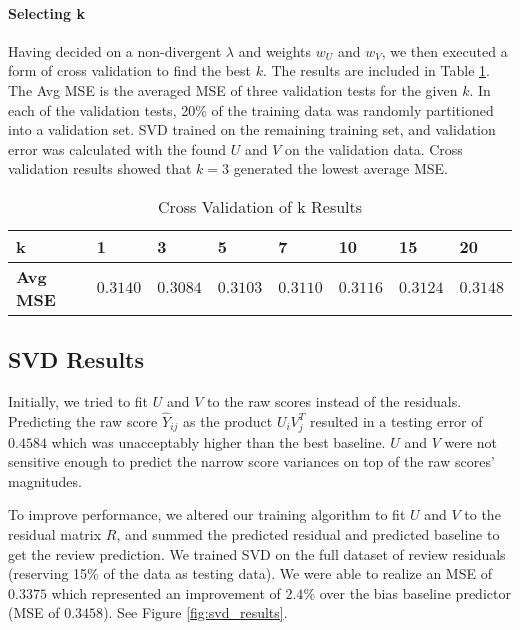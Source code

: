 \documentclass[12pt]{article}
\begin{document}
\paragraph{Selecting k} Having decided on a non-divergent $\lambda$ and weights $w_U$ and $w_V$, we then executed a form of cross validation to find the best $k$. The results are included in Table \ref{tab:k_selection}. The Avg MSE is the averaged MSE of three validation tests for the given $k$. In each of the validation tests, 20\% of the training data was randomly partitioned into a validation set. SVD trained on the remaining training set, and validation error was calculated with the found $U$ and $V$ on the validation data. Cross validation results showed that $k = 3$ generated the lowest average MSE. 

\begin{table}[ht!]
\centering
\caption{Cross Validation of k Results}
\label{tab:k_selection}
\vspace{2mm}
\begin{tabular}{llllllll}
\hline
\textbf{k}             &  1 				& \textbf{3}          	& 5             & 7             & 10        & 15        & 20 \\ \hline
\textbf{Avg MSE}       & $0.3140$		& {$\mathbf{0.3084}$}   	& $0.3103$      & $0.3110$      & $0.3116$  & $0.3124$  & $0.3148$\\ \hline
\end{tabular}
\end{table}

\subsection*{SVD Results}
Initially, we tried to fit $U$ and $V$ to the raw scores instead of the residuals. Predicting the raw score $\hat Y_{ij}$ as the product $U_i V_j^T$ resulted in a testing error of $0.4584$ which was unacceptably higher than the best baseline. $U$ and $V$ were not sensitive enough to predict the narrow score variances on top of the raw scores' magnitudes.

To improve performance, we altered our training algorithm to fit $U$ and $V$ to the residual matrix $R$, and summed the predicted residual and predicted baseline to get the review prediction. We trained SVD on the full dataset of review residuals (reserving 15\% of the data as testing data). We were able to realize an MSE of $0.3375$ which represented an improvement of $2.4\%$ over the bias baseline predictor (MSE of $0.3458$). See Figure \ref{fig:svd_results}.
\end{document}
